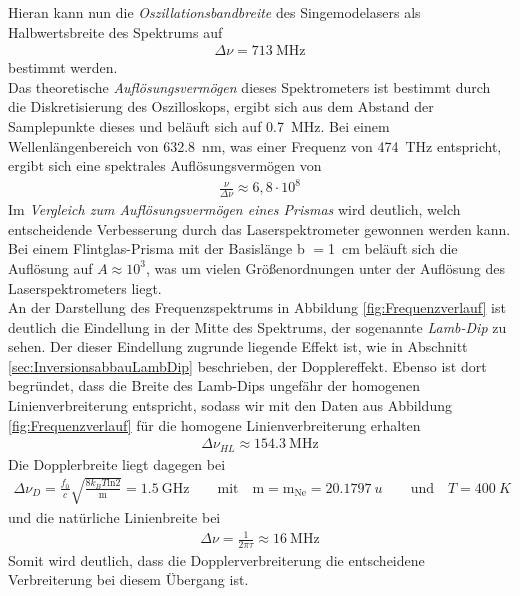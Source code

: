 \documentclass[a4paper,twoside,final]{article}
\begin{document}
Hieran kann nun die \textit{Oszillationsbandbreite} des Singemodelasers als Halbwertsbreite des Spektrums auf
\begin{align}
  \Delta \nu = \SI{713}{\mega\hertz}
\end{align}
bestimmt werden.\\
Das theoretische \textit{Auflösungsvermögen} dieses Spektrometers ist bestimmt durch die Diskretisierung des Oszilloskops, ergibt sich aus dem Abstand der Samplepunkte dieses und beläuft sich auf \SI{0,7}{\mega\hertz}. Bei einem Wellenlängenbereich von \SI{632,8}{\nano\meter}, was einer Frequenz von \SI{474}{\tera\hertz} entspricht,  ergibt sich eine spektrales Auflösungsvermögen von
\begin{align}
  \frac{\nu}{\Delta\nu} \approx 6,8\cdot10^8
\end{align}
Im \textit{Vergleich zum Auflösungsvermögen eines Prismas} wird deutlich, welch entscheidende Verbesserung durch das Laserspektrometer gewonnen werden kann. Bei einem Flintglas-Prisma mit der Basislänge b $=$\SI{1}{\centi\meter} beläuft sich die Auflösung auf $A \approx 10^3$, was um vielen Größenordnungen unter der Auflösung des Laserspektrometers liegt. \\
An der Darstellung des Frequenzspektrums in Abbildung \ref{fig:Frequenzverlauf} ist deutlich die Eindellung in der Mitte des Spektrums, der sogenannte \textit{Lamb-Dip} zu sehen. Der dieser Eindellung zugrunde liegende Effekt ist, wie in Abschnitt \ref{sec:InversionsabbauLambDip} beschrieben, der Dopplereffekt. Ebenso ist dort begründet, dass die Breite des Lamb-Dips ungefähr der homogenen Linienverbreiterung entspricht, sodass wir mit den Daten aus Abbildung \ref{fig:Frequenzverlauf} für die homogene Linienverbreiterung erhalten
\begin{align}
  \Delta \nu_{HL} \approx \SI{154,3}{\mega \hertz}
\end{align}
Die Dopplerbreite liegt dagegen bei
\begin{align}
  \Delta \nu_{D}= \frac{f_0}{c} \sqrt{\frac{8 k_B T \text{ln} 2}{\text{m}}} = \SI{1,5}{\giga\hertz} \qquad \text{mit}\quad \text{m} = \text{m}_{\text{Ne}}
 = \SI{20,1797}{u} \qquad \text{und} \quad T= \SI{400}{K}
\end{align}
und die natürliche Linienbreite bei
\begin{align}
  \Delta \nu = \frac{1}{2\pi\tau}\approx \SI{16}{\mega\hertz}
\end{align}
Somit wird deutlich, dass die Dopplerverbreiterung die entscheidene Verbreiterung bei diesem Übergang ist.
\end{document}
